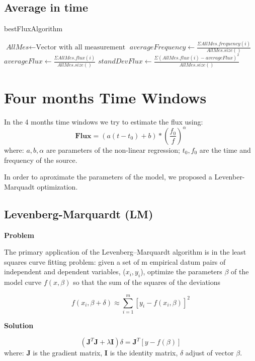 \documentclass[10pt]{article}
\begin{document}
\subsection{Average in time}
\begin{algorithm}
\caption{bestFluxAlgorithm}\label{4months}
\begin{algorithmic}[1]
\State $\textit{AllMes} \gets \text{Vector with all measurement}$
\Statex
\State $\textit{averageFrequency} \gets \frac{\Sigma AllMes.frequency(i)}{AllMes.size()}$
\Statex
\State $\textit{averageFlux} \gets \frac{\Sigma AllMes.flux(i)}{AllMes.size()}$
\Statex
\State $\textit{standDevFlux} \gets \frac{\Sigma (AllMes.flux(i) - averageFlux)^2}{AllMes.size()}$
\Statex
\State {}
\EndProcedure
\end{algorithmic}
\end{algorithm}

\section{Four months Time Windows}
In the 4 months time windows we try to estimate the flux using:
$$ \mathbf{Flux} = (a(t-t_0)+b)*\left(\frac{f_0}{f}\right)^\alpha $$
where: $a,b,\alpha$ are parameters of the non-linear regression; $t_0, f_0$ are
the time and frequency of the source.

In order to aproximate the parameters of the model, we proposed a
Levenber-Marquadt optimization. 

\subsection{Levenberg-Marquardt (LM)}
\textbf{Problem} 

The primary application of the Levenberg–Marquardt algorithm is in the least
squares curve fitting problem: given a set of m empirical datum pairs of
independent and dependent variables, ($x_i, y_i$), optimize the parameters
$\beta$ of the model curve $f(x,\beta)$ so that the sum of the squares of the
deviations

$$ f(x_i, \beta + \delta) \approx \sum\limits_{i=1}^m [y_i - f(x_i, \beta)]^2 $$

\noindent\textbf{Solution} 

$$ (\mathbf{J}^{T}\mathbf{J} + \lambda\mathbf{I})\delta = \mathbf{J}^{T}[y - f(\beta)] $$
where: $\mathbf{J}$ is the gradient matrix, $\mathbf{I}$ is the identity matrix, $\delta$ adjust of vector $\beta$.
\end{document}
